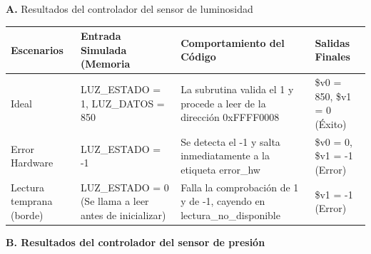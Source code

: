 \documentclass[]{article}
\begin{document}
	\textbf{A.} Resultados del controlador del sensor de luminosidad \\
	
	\begin{table}[H]
		\centering
		\renewcommand{\arraystretch}{1.5}
		\begin{tabularx}{\textwidth}{|X | X | X | X|}
			\hline
			
			\textbf{Escenarios} & \textbf{Entrada Simulada (Memoria} & \textbf{Comportamiento del Código} & \textbf{Salidas Finales}\\
			
			\hline
			
			Ideal & LUZ\_ESTADO = 1, LUZ\_DATOS = 850 & La subrutina valida el 1 y procede a leer de la dirección 0xFFFF0008 & \$v0 = 850, \$v1 = 0 (Éxito) \\
			
			\hline
			
			Error Hardware & LUZ\_ESTADO = -1 & Se detecta el -1 y salta inmediatamente a la etiqueta error\_hw & \$v0 = 0, \$v1 = -1 (Error) \\
			
			\hline
			
			Lectura temprana (borde) & LUZ\_ESTADO = 0 (Se llama a leer antes de inicializar) & Falla la comprobación de 1 y de -1, cayendo en lectura\_no\_disponible & \$v1 = -1 (Error) \\
			
			\hline
		\end{tabularx}
	\end{table}
	
	\textbf{B. Resultados del controlador del sensor de presión} \\
	
\end{document}
